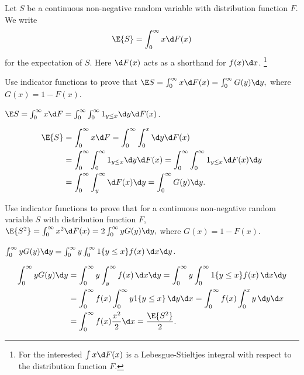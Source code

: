 Let $S$ be a continuous non-negative random variable with distribution function $F$.  We write 
\begin{equation*}
  \E{S} = \int_0^\infty x \d F(x)
\end{equation*}
for the expectation of $S$. Here $\d F(x)$ acts as a shorthand for $f(x) \d x$. \footnote{For the interested $\int x \d F(x)$ is a Lebesgue-Stieltjes integral with respect to the distribution function $F$.}

\begin{exercise}
 Use indicator functions to prove that 
$   \E S = \int_0^\infty x \d F(x)  = \int_0^\infty G(y) \d y,$
where $G(x) = 1 - F(x)$. 
\begin{hint}
$\E S = \int_0^\infty x \d F  = \int_0^\infty \int_0^\infty 1_{y\leq x} \d y \d F(x)$.
\end{hint}
\begin{solution}
\begin{equation*}
  \begin{split}
    \E{S} &= \int_0^\infty x \d F  = \int_0^\infty \int_0^x \d y \d F(x) \\
    & = \int_0^\infty \int_0^\infty 1_{y\leq x} \d y \d F(x)   = \int_0^\infty \int_0^\infty 1_{y\leq x} \d F(x) \d y\\
    & = \int_0^\infty \int_y^\infty \d F(x) \d y = \int_0^\infty G(y) \d y.
  \end{split}
\end{equation*}
\end{solution}
\end{exercise}

\begin{exercise}
 Use indicator functions to prove that for a continuous non-negative random
    variable $S$ with distribution function $F$, 
$    \E{S^2} = \int_0^\infty x^2 \d F(x)  = 2 \int_0^\infty y G(y) \d y,$
where $G(x) = 1 - F(x)$. 
\begin{hint}
$\int_0^\infty y G(y) \d y = \int_0^\infty y \int_0^\infty 1\{y\leq x\}f(x)\, \d x \d y$.
\end{hint}
\begin{solution}
  \begin{align*}
\int_0^\infty y G(y) \d y 
&=  \int_0^\infty y \int_y^\infty f(x)\, \d x \d y =  \int_0^\infty y \int_0^\infty 1\{y\leq x\}f(x)\, \d x \d y\\
&=  \int_0^\infty f(x) \int_0^\infty y 1\{y \leq x\}\, \d y \d x
=  \int_0^\infty f(x) \int_0^x y\, \d y \d x\\
&=  \int_0^\infty f(x) \frac{x^2}2 \d x =\frac{\E{S^2}}2.
  \end{align*}
\end{solution}
\end{exercise}

